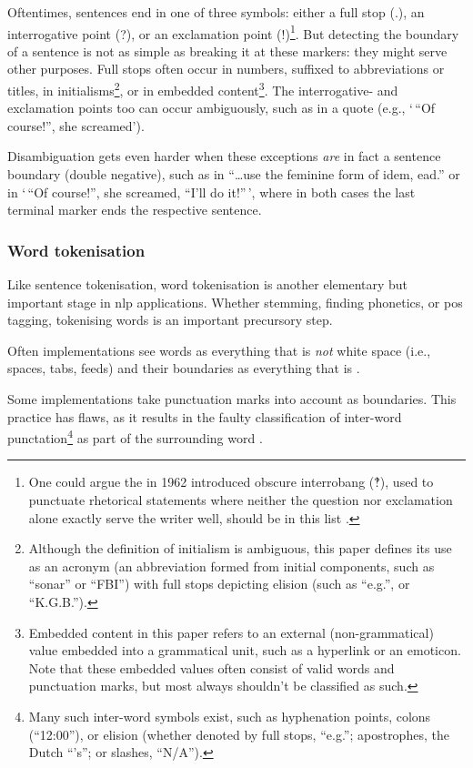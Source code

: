 Oftentimes, sentences end in one of three symbols: either a full stop (.),
  an interrogative point (?), or an exclamation point (!)\footnote{One
    could argue the in 1962 introduced
    obscure interrobang (‽), used to punctuate rhetorical statements where
    neither the question nor exclamation alone exactly serve the writer
    well, should be in this list \autocite{interrobang-mks.com}.}.
But detecting the boundary of a sentence is not as simple as breaking it at
  these markers: they might serve other purposes.
Full stops often occur in numbers, suffixed to abbreviations or titles,
  in initialisms\footnote{Although
    the definition of initialism is ambiguous, this paper defines its use
    as an acronym (an abbreviation formed from initial components, such as
    ``sonar'' or ``FBI'') with full stops depicting elision (such as
    ``e.g.'', or ``K.G.B.'').},
  or in embedded content\footnote{Embedded
    content in this paper refers to an external (non-grammatical) value
    embedded into a grammatical unit, such as a hyperlink or an emoticon.
    Note that these embedded values often consist of valid words and
    punctuation marks, but most always shouldn't be classified as such.}.
The interrogative- and exclamation points too can occur ambiguously, such as
  in a quote (e.g., `\,``Of course!'', she screamed').

Disambiguation gets even harder when these exceptions \emph{are} in fact a
  sentence boundary (double negative), such as in
  ``\ldots{}use the feminine form of idem, ead.'' or in
  `\,``Of course!'', she screamed, ``I'll do it!''\,', where in both
  cases the last terminal marker ends the respective sentence.

\subsubsection{Word tokenisation}\label{word-tokenisation}

Like sentence tokenisation, word tokenisation is another elementary but
important stage in \gls{nlp} applications. Whether stemming, finding
phonetics, or \gls{pos} tagging, tokenising words is an important
precursory step.

Often implementations see words as everything that is \emph{not} white
  space (i.e., spaces, tabs, feeds) and their boundaries as everything that
  is \autocite{loadfive/knwl-source-code}.

Some implementations take punctuation marks into account as boundaries.
This practice has flaws, as it results in the faulty classification of
  inter-word punctation\footnote{Many such inter-word symbols exist, such
    as hyphenation points, colons (``12:00''), or elision (whether denoted
    by full stops, ``e.g.''; apostrophes, the Dutch ``'s''; or slashes,
    ``N/A'').}
  as part of the surrounding word \autocite{NaturalNode/natural-source-code}.

